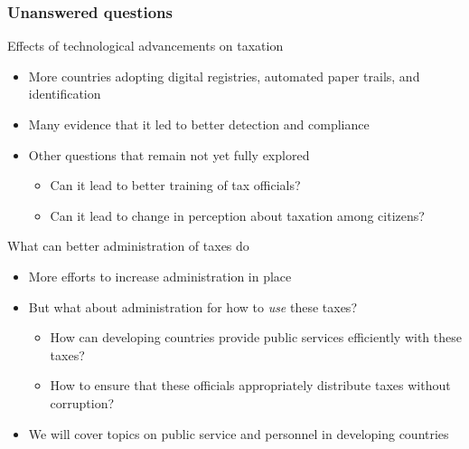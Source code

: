 \documentclass[aspectratio=169]{beamer}
\begin{document}
 
\begin{frame}
\frametitle{Unanswered questions} 
Effects of technological advancements on taxation
\begin{itemize}\setlength\itemsep{3pt}
\item More countries adopting digital registries, automated paper trails, and identification
\item Many evidence that it led to better detection and compliance
\item Other questions that remain not yet fully explored 
 \begin{itemize}\setlength\itemsep{3pt}
\item Can it lead to better training of tax officials?
\item Can it lead to change in perception about taxation among citizens?
\end{itemize}
\end{itemize}\medskip
What can better administration of taxes do
\begin{itemize}\setlength\itemsep{3pt}
\item More efforts to increase administration in place
\item But what about administration for how to \textit{use} these taxes?
 \begin{itemize}\setlength\itemsep{3pt}
\item How can developing countries provide public services efficiently with these taxes?
\item How to ensure that these officials appropriately distribute taxes without corruption?
\end{itemize}
\item We will cover topics on public service and personnel in developing countries 
\end{itemize}
\end{frame}
\end{document}
